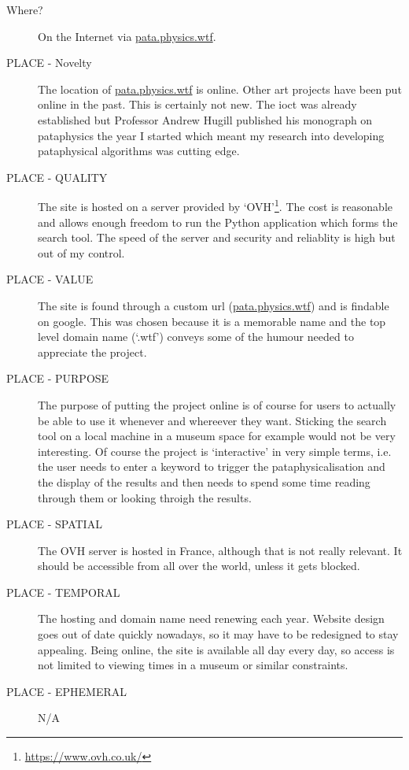 \begin{description}
  \item[Where?] On the Internet via \url{pata.physics.wtf}.
  \item[PLACE - Novelty] The location of \url{pata.physics.wtf} is online. Other art projects have been put online in the past. This is certainly not new. The \gls{ioct} was already established but Professor Andrew Hugill published his monograph on pataphysics the year I started which meant my research into developing pataphysical algorithms was cutting edge.  
  \item[PLACE - QUALITY] The site is hosted on a server provided by `OVH'\footnote{\url{https://www.ovh.co.uk/}}. The cost is reasonable and allows enough freedom to run the Python application which forms the search tool. The speed of the server and security and reliablity is high but out of my control.
  \item[PLACE - VALUE] The site is found through a custom \gls{url} (\url{pata.physics.wtf}) and is findable on google. This was chosen because it is a memorable name and the top level domain name (`.wtf') conveys some of the humour needed to appreciate the project.
  \item[PLACE - PURPOSE] The purpose of putting the project online is of course for users to actually be able to use it whenever and whereever they want. Sticking the search tool on a local machine in a museum space for example would not be very interesting. Of course the project is `interactive' in very simple terms, i.e. the user needs to enter a keyword to trigger the pataphysicalisation and the display of the results and then needs to spend some time reading through them or looking throigh the results.
  \item[PLACE - SPATIAL] The OVH server is hosted in France, although that is not really relevant. It should be accessible from all over the world, unless it gets blocked.
  \item[PLACE - TEMPORAL] The hosting and domain name need renewing each year. Website design goes out of date quickly nowadays, so it may have to be redesigned to stay appealing. Being online, the site is available all day every day, so access is not limited to viewing times in a museum or similar constraints.
  \item[PLACE - EPHEMERAL] N/A
\end{description}

\spirals


